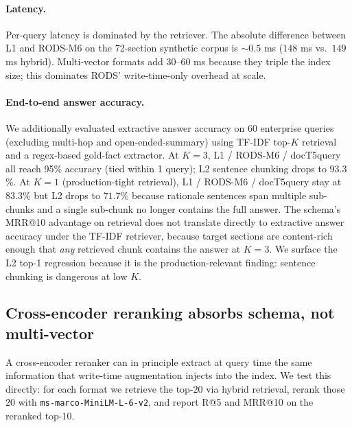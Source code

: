 \documentclass[11pt]{article}
\begin{document}
\paragraph{Latency.} Per-query latency is dominated by the retriever.
The absolute difference between L1 and RODS-M6 on the 72-section
synthetic corpus is $\sim 0.5$ ms ($148$ ms vs.\ $149$ ms hybrid).
Multi-vector formats add $30$--$60$ ms because they triple the index
size; this dominates RODS' write-time-only overhead at scale.

\paragraph{End-to-end answer accuracy.} We additionally evaluated
extractive answer accuracy on 60 enterprise queries (excluding
multi-hop and open-ended-summary) using TF-IDF top-$K$ retrieval and
a regex-based gold-fact extractor. At $K{=}3$, L1 / RODS-M6 / docT5query
all reach 95\% accuracy (tied within 1 query); L2 sentence chunking
drops to $93.3$\%. At $K{=}1$ (production-tight retrieval), L1 / RODS-M6
/ docT5query stay at $83.3$\% but L2 drops to $71.7$\% because rationale
sentences span multiple sub-chunks and a single sub-chunk no longer
contains the full answer. The schema's MRR@10 advantage on retrieval
does not translate directly to extractive answer accuracy under the
TF-IDF retriever, because target sections are content-rich enough that
\emph{any} retrieved chunk contains the answer at $K{=}3$. We surface
the L2 top-1 regression because it is the production-relevant
finding: sentence chunking is dangerous at low $K$.

\subsection{Cross-encoder reranking absorbs schema, not multi-vector}
\label{sec:rerank}

A cross-encoder reranker can in principle extract at query time the
same information that write-time augmentation injects into the index.
We test this directly: for each format we retrieve the top-$20$ via
hybrid retrieval, rerank those $20$ with
\texttt{ms-marco-MiniLM-L-6-v2}, and report R@5 and MRR@10 on the
reranked top-$10$.
\end{document}
